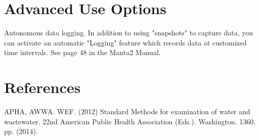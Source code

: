 \documentclass[12pt]{../SOP3}\usepackage[]{graphicx}\usepackage[]{color}
\begin{document}
\section{Advanced Use Options}

 \NP Autonomous data logging. In addition to using "snapshots" to capture data, you can activate an automatic "Logging" feature which records data at customized time intervals. See page 48 in the Manta2 Manual.

\section{References}

\NP APHA, AWWA. WEF. (2012) Standard Methods for examination of water and wastewater. 22nd American Public Health Association (Eds.). Washington. 1360. pp. (2014).
\end{document}
